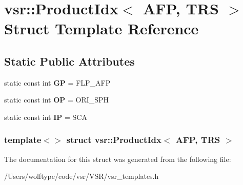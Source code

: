 \hypertarget{structvsr_1_1_product_idx_3_01_a_f_p_00_01_t_r_s_01_4}{\section{vsr\-:\-:Product\-Idx$<$ A\-F\-P, T\-R\-S $>$ Struct Template Reference}
\label{structvsr_1_1_product_idx_3_01_a_f_p_00_01_t_r_s_01_4}
}
\subsection*{Static Public Attributes}
\begin{DoxyCompactItemize}
\item 
\hypertarget{structvsr_1_1_product_idx_3_01_a_f_p_00_01_t_r_s_01_4_ab54b45988ca3b62aeb09c769e0521c88}{static const int {\bfseries G\-P} = F\-L\-P\-\_\-\-A\-F\-P}\label{structvsr_1_1_product_idx_3_01_a_f_p_00_01_t_r_s_01_4_ab54b45988ca3b62aeb09c769e0521c88}

\item 
\hypertarget{structvsr_1_1_product_idx_3_01_a_f_p_00_01_t_r_s_01_4_a7fab94be159ecfc3d33f397284eee4c9}{static const int {\bfseries O\-P} = O\-R\-I\-\_\-\-S\-P\-H}\label{structvsr_1_1_product_idx_3_01_a_f_p_00_01_t_r_s_01_4_a7fab94be159ecfc3d33f397284eee4c9}

\item 
\hypertarget{structvsr_1_1_product_idx_3_01_a_f_p_00_01_t_r_s_01_4_af2afa6f03fbe9f4ed8da8599a5db5c32}{static const int {\bfseries I\-P} = S\-C\-A}\label{structvsr_1_1_product_idx_3_01_a_f_p_00_01_t_r_s_01_4_af2afa6f03fbe9f4ed8da8599a5db5c32}

\end{DoxyCompactItemize}
\subsubsection*{template$<$$>$ struct vsr\-::\-Product\-Idx$<$ A\-F\-P, T\-R\-S $>$}



The documentation for this struct was generated from the following file\-:\begin{DoxyCompactItemize}
\item 
/\-Users/wolftype/code/vsr/\-V\-S\-R/vsr\-\_\-templates.\-h\end{DoxyCompactItemize}
